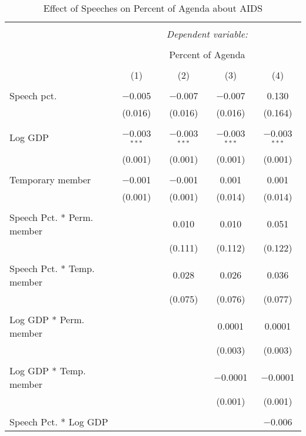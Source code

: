 
\begin{table}[!htbp] \centering 
  \caption{Effect of Speeches on Percent of Agenda about  AIDS} 
  \label{} 
\begin{tabular}{@{\extracolsep{5pt}}lcccc} 
\\[-1.8ex]\hline 
\hline \\[-1.8ex] 
 & \multicolumn{4}{c}{\textit{Dependent variable:}} \\ 
\cline{2-5} 
\\[-1.8ex] & \multicolumn{4}{c}{Percent of Agenda} \\ 
\\[-1.8ex] & (1) & (2) & (3) & (4)\\ 
\hline \\[-1.8ex] 
 Speech pct. & $-$0.005 & $-$0.007 & $-$0.007 & 0.130 \\ 
  & (0.016) & (0.016) & (0.016) & (0.164) \\ 
  & & & & \\ 
 Log GDP & $-$0.003$^{***}$ & $-$0.003$^{***}$ & $-$0.003$^{***}$ & $-$0.003$^{***}$ \\ 
  & (0.001) & (0.001) & (0.001) & (0.001) \\ 
  & & & & \\ 
 Temporary member & $-$0.001 & $-$0.001 & 0.001 & 0.001 \\ 
  & (0.001) & (0.001) & (0.014) & (0.014) \\ 
  & & & & \\ 
 Speech Pct. * Perm. member &  & 0.010 & 0.010 & 0.051 \\ 
  &  & (0.111) & (0.112) & (0.122) \\ 
  & & & & \\ 
 Speech Pct. * Temp. member &  & 0.028 & 0.026 & 0.036 \\ 
  &  & (0.075) & (0.076) & (0.077) \\ 
  & & & & \\ 
 Log GDP * Perm. member &  &  & 0.0001 & 0.0001 \\ 
  &  &  & (0.003) & (0.003) \\ 
  & & & & \\ 
 Log GDP * Temp. member &  &  & $-$0.0001 & $-$0.0001 \\ 
  &  &  & (0.001) & (0.001) \\ 
  & & & & \\ 
 Speech Pct. * Log GDP &  &  &  & $-$0.006 \\ 

\end{tabular}
\end{table}
